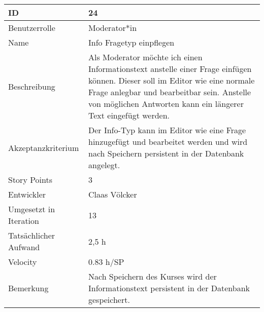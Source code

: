 \begin{tabularx}{\textwidth}{|p{}|X|}
	\hline
	ID & 24 \\
	\hline
	Benutzerrolle & Moderator*in \\
	\hline
	Name & Info Fragetyp einpflegen\\
	\hline
	Beschreibung & Als Moderator möchte ich einen Informationstext anstelle einer Frage einfügen können.
		Dieser soll im Editor wie eine normale Frage anlegbar und bearbeitbar sein.
		Anstelle von möglichen Antworten kann ein längerer Text eingefügt werden.\\
	\hline
	Akzeptanzkriterium & Der Info-Typ kann im Editor wie eine Frage hinzugefügt und bearbeitet werden und wird nach Speichern persistent in der Datenbank angelegt. \\
	\hline
	Story Points & 3 \\
	\hline
	Entwickler & Claas Völcker\\
	\hline
	Umgesetzt in Iteration & 13\\
	\hline
	Tatsächlicher Aufwand & 2,5 h\\
	\hline
	Velocity & 0.83 h/SP\\
	\hline
	Bemerkung & Nach Speichern des Kurses wird der Informationstext persistent in der Datenbank gespeichert.\\
	\hline
\end{tabularx}
\vspace{20pt}
